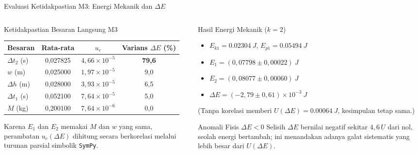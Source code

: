 \documentclass[aspectratio=169,10pt]{beamer}
\newcommand{\sm}{\fontsize{8.2}{10.2}\selectfont}
\newcommand{\xs}{\fontsize{7.1}{9}\selectfont}
\newcommand{\uc}{u_{c}}
\begin{document}
\begin{frame}{Evaluasi Ketidakpastian M3: Energi Mekanik dan $\Delta E$}
\begin{columns}[T,onlytextwidth]
\begin{column}{.50\textwidth}
\begin{block}{Ketidakpastian Besaran Langsung M3}\xs
\centering
\setlength{\tabcolsep}{3.5pt}\begin{tabular}{@{}lccc@{}}
\toprule
\textbf{Besaran} & \textbf{Rata-rata} & $\uc$ & \textbf{Varians $\Delta E$ (\%)}\\
\midrule
$\Delta t_2$ (s) & 0,027825 & $4{,}66\times 10^{-5}$ & \textbf{79,6}\\
$w$ (m) & 0,025000 & $1{,}97\times 10^{-5}$ & 9,0\\
$\Delta h$ (m) & 0,028000 & $3{,}93\times 10^{-5}$ & 6,5\\
$\Delta t_1$ (s) & 0,052100 & $7{,}64\times 10^{-5}$ & 5,0\\
$M$ (kg) & 0,200100 & $7{,}64\times 10^{-6}$ & 0,0\\
\bottomrule
\end{tabular}
\par\vspace{1.5mm}\raggedright
Karena $E_1$ dan $E_2$ memakai $M$ dan $w$ yang sama, perambatan $\uc(\Delta E)$ dihitung secara berkorelasi melalui turunan parsial simbolik \texttt{SymPy}.
\end{block}
\end{column}

\begin{column}{.48\textwidth}
\begin{exampleblock}{Hasil Energi Mekanik ($k=2$)}\sm
\begin{itemize}
\item $E_{k1} = \SI{0,02304}{J}$, \quad $E_{p1} = \SI{0,05494}{J}$
\item $E_1 = (0{,}07798 \pm 0{,}00022)\ \si{J}$
\item $E_2 = (0{,}08077 \pm 0{,}00060)\ \si{J}$
\item $\boxed{\Delta E = (-2{,}79 \pm 0{,}61)\times 10^{-3}\ \si{J}}$
\end{itemize}
{\xs (Tanpa korelasi memberi $U(\Delta E)=\SI{0,00064}{J}$, kesimpulan tetap sama.)}
\end{exampleblock}
\begin{alertblock}{Anomali Fisis $\Delta E < 0$}\xs
Selisih $\Delta E$ bernilai negatif sekitar $4{,}6\,U$ dari nol, seolah energi bertambah; ini menandakan adanya galat sistematis yang lebih besar dari $U(\Delta E)$.
\end{alertblock}
\end{column}
\end{columns}
\end{frame}
\end{document}
